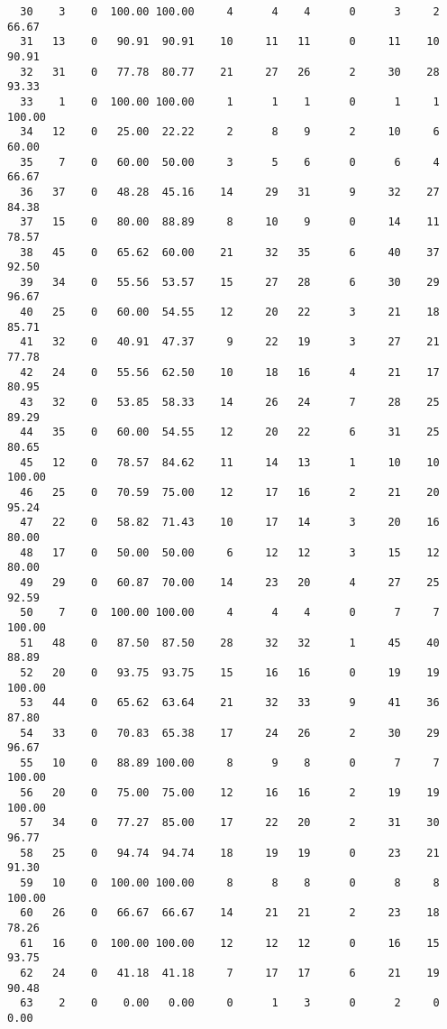 \begin{verbatim}
  30    3    0  100.00 100.00     4      4    4      0      3     2    66.67
  31   13    0   90.91  90.91    10     11   11      0     11    10    90.91
  32   31    0   77.78  80.77    21     27   26      2     30    28    93.33
  33    1    0  100.00 100.00     1      1    1      0      1     1   100.00
  34   12    0   25.00  22.22     2      8    9      2     10     6    60.00
  35    7    0   60.00  50.00     3      5    6      0      6     4    66.67
  36   37    0   48.28  45.16    14     29   31      9     32    27    84.38
  37   15    0   80.00  88.89     8     10    9      0     14    11    78.57
  38   45    0   65.62  60.00    21     32   35      6     40    37    92.50
  39   34    0   55.56  53.57    15     27   28      6     30    29    96.67
  40   25    0   60.00  54.55    12     20   22      3     21    18    85.71
  41   32    0   40.91  47.37     9     22   19      3     27    21    77.78
  42   24    0   55.56  62.50    10     18   16      4     21    17    80.95
  43   32    0   53.85  58.33    14     26   24      7     28    25    89.29
  44   35    0   60.00  54.55    12     20   22      6     31    25    80.65
  45   12    0   78.57  84.62    11     14   13      1     10    10   100.00
  46   25    0   70.59  75.00    12     17   16      2     21    20    95.24
  47   22    0   58.82  71.43    10     17   14      3     20    16    80.00
  48   17    0   50.00  50.00     6     12   12      3     15    12    80.00
  49   29    0   60.87  70.00    14     23   20      4     27    25    92.59
  50    7    0  100.00 100.00     4      4    4      0      7     7   100.00
  51   48    0   87.50  87.50    28     32   32      1     45    40    88.89
  52   20    0   93.75  93.75    15     16   16      0     19    19   100.00
  53   44    0   65.62  63.64    21     32   33      9     41    36    87.80
  54   33    0   70.83  65.38    17     24   26      2     30    29    96.67
  55   10    0   88.89 100.00     8      9    8      0      7     7   100.00
  56   20    0   75.00  75.00    12     16   16      2     19    19   100.00
  57   34    0   77.27  85.00    17     22   20      2     31    30    96.77
  58   25    0   94.74  94.74    18     19   19      0     23    21    91.30
  59   10    0  100.00 100.00     8      8    8      0      8     8   100.00
  60   26    0   66.67  66.67    14     21   21      2     23    18    78.26
  61   16    0  100.00 100.00    12     12   12      0     16    15    93.75
  62   24    0   41.18  41.18     7     17   17      6     21    19    90.48
  63    2    0    0.00   0.00     0      1    3      0      2     0     0.00

\end{verbatim}
